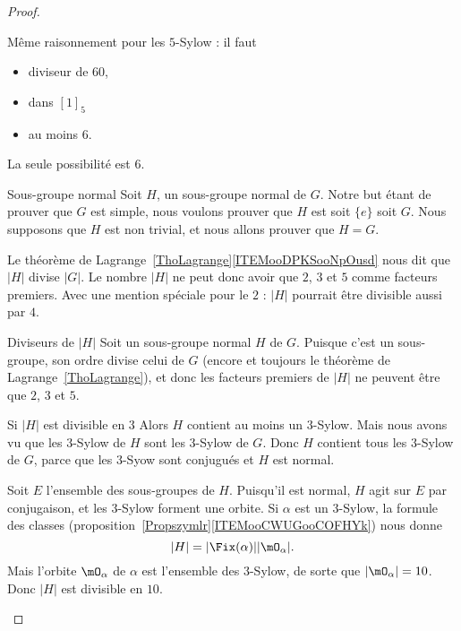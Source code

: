 \begin{proof}
\begin{subproof}
		Même raisonnement pour les \( 5\)-Sylow : il faut
		\begin{itemize}
			\item diviseur de \( 60\),
			\item dans \( [1]_5\)
			\item au moins \( 6\).
		\end{itemize}
		La seule possibilité est \( 6\).

		\item[Sous-groupe normal]
		Soit \( H\), un sous-groupe normal de \( G\). Notre but étant de prouver que \( G\) est simple, nous voulons prouver que \( H\) est soit \( \{ e \}\) soit \( G\). Nous supposons que \( H\) est non trivial, et nous allons prouver que \( H=G\).

		Le théorème de Lagrange~\ref{ThoLagrange}\ref{ITEMooDPKSooNpOusd} nous dit que \( | H |\) divise \( | G |\). Le nombre \( | H |\) ne peut donc avoir que \( 2\), \( 3\) et \( 5\) comme facteurs premiers. Avec une mention spéciale pour le \( 2\) : \( | H |\) pourrait être divisible aussi par \( 4\).

		\item[Diviseurs de \( | H |\)]
		Soit un sous-groupe normal \( H\) de \( G\). Puisque c'est un sous-groupe, son ordre divise celui de \( G\) (encore et toujours le théorème de Lagrange~\ref{ThoLagrange}), et donc les facteurs premiers de \( | H |\) ne peuvent être que \( 2\), \( 3\) et \( 5\).

		\item[Si \( | H |\) est divisible en \( 3\)]
		Alors \( H\) contient au moins un \( 3\)-Sylow. Mais nous avons vu que les \( 3\)-Sylow de \( H\) sont les \( 3\)-Sylow de \( G\). Donc \( H\) contient tous les \( 3\)-Sylow de \( G\), parce que les \( 3\)-Syow sont conjugués et \( H\) est normal.

		Soit \( E\) l'ensemble des sous-groupes de \( H\). Puisqu'il est normal, \( H\) agit sur \( E\) par conjugaison, et les \( 3\)-Sylow forment une orbite. Si \( \alpha\) est un \( 3\)-Sylow, la formule des classes (proposition~\ref{Propszymlr}\ref{ITEMooCWUGooCOFHYk}) nous donne
		\begin{equation}
			| H |=| \Fix(\alpha) | |\mO_{\alpha} |.
		\end{equation}
		Mais l'orbite \( \mO_{\alpha}\) de \( \alpha\) est l'ensemble des \( 3\)-Sylow, de sorte que \( | \mO_{\alpha} |=10\). Donc \( | H |\) est divisible en \( 10\).


\end{subproof}
\end{proof}

